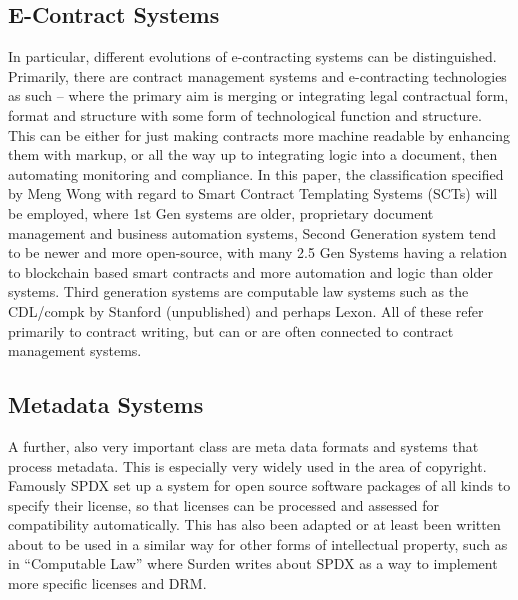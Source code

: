 \documentclass[conference]{IEEEtran}
\begin{document}
\subsection{E-Contract Systems}
In particular, different evolutions of e-contracting systems can be distinguished. Primarily, there are contract management systems  and e-contracting technologies as such – where the primary aim is merging or integrating legal contractual form, format and structure with some form of technological function and structure. This can be either for just making contracts more machine readable by enhancing them with markup, or all the way up to integrating logic into a document, then automating monitoring and compliance.
In this paper, the classification specified by Meng Wong with regard to Smart Contract Templating Systems (SCTs) \cite{wongmengComputableContractsAcademia2018} %
will be employed, where 1st Gen systems are older, proprietary document management and business automation systems,  Second Generation system tend to be newer and more open-source, with many 2.5 Gen Systems having a relation to blockchain based smart contracts and more automation and logic than older systems. Third generation systems are computable law systems such as the CDL/compk  by Stanford (unpublished) \cite{ComputableContracts} and perhaps Lexon. All of these refer primarily to contract writing, but can or are often connected to contract management systems. %

\subsection{Metadata Systems}
A further, also very important class are meta data formats and systems that process metadata. This is especially very widely used in the area of copyright. Famously SPDX \cite{odenceAdvancingSoftwarePackage2013} set up a system for open source software packages of all kinds to specify their license, so that licenses can be processed and assessed for compatibility automatically. This has also been adapted or at least been written about to be used in a similar way for other forms of intellectual property, such as in “Computable Law” where Surden writes about SPDX as a way to implement more specific licenses and DRM. \cite{surdenComputableContracts2012}

\end{document}
